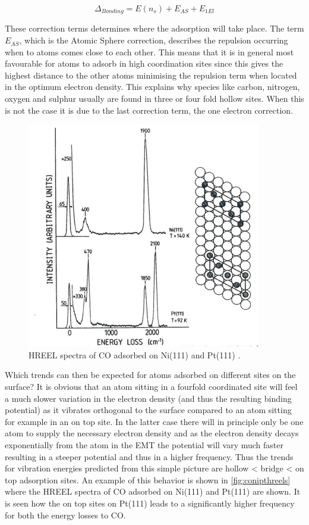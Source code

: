 \begin{equation}
\Delta_{Bonding}=E(n_s)+E_{AS}+E_{1El}
\end{equation}

These correction terms determines where the adsorption will take place. The term $E_{AS}$, which is the Atomic Sphere correction, describes the repulsion occurring when to atoms comes close to each other. This means that it is in general most favourable for atoms to adsorb in high coordination sites since this gives the highest distance to the other atoms  minimising the repulsion term when located in the optimum electron density. This explains why species like carbon, nitrogen, oxygen and sulphur usually are found in three or four fold hollow sites. When this is not the case it is due to the last  correction term, the one electron correction.

\begin{figure}[h!]
	\begin{center}
	\includegraphics[scale=4]{figures/08_07.png}
	\caption{HREEL spectra of CO adsorbed on Ni(111) and Pt(111) \cite{Ibach}.}
	\label{fig:conipthreels}
	\end{center}
\end{figure}

Which trends can then be expected for atoms adsorbed on different sites on the surface? It is obvious that an atom sitting in a fourfold coordinated site will feel a much slower variation in the electron density (and thus the resulting binding potential) as it vibrates orthogonal to the surface compared to an atom sitting for example in an  on top site. In the  latter case there will in principle  only be  one atom to supply the necessary electron density and as the electron density decays exponentially from the atom in the EMT the potential will vary much faster resulting in a steeper potential and thus in a higher frequency.  Thus the trends for vibration energies  predicted from this simple picture are hollow < bridge < on top adsorption sites.
An example of this behavior is shown in \autoref{fig:conipthreels} where the HREEL spectra of CO adsorbed on Ni(111) and Pt(111) are shown.  It is seen how the on top sites on Pt(111) leads to a significantly higher frequency for both the energy losses to CO.

